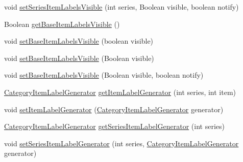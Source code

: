 \begin{DoxyCompactItemize}
\item 
void \mbox{\hyperlink{interfaceorg_1_1jfree_1_1chart_1_1renderer_1_1category_1_1_category_item_renderer_a72da4632864d702099baba455d3f8576}{set\+Series\+Item\+Labels\+Visible}} (int series, Boolean visible, boolean notify)
\item 
Boolean \mbox{\hyperlink{interfaceorg_1_1jfree_1_1chart_1_1renderer_1_1category_1_1_category_item_renderer_a2d90e661b0f4c361b2f378293310a3e6}{get\+Base\+Item\+Labels\+Visible}} ()
\item 
void \mbox{\hyperlink{interfaceorg_1_1jfree_1_1chart_1_1renderer_1_1category_1_1_category_item_renderer_ac6695ccdc953127606d151a4b17f70a7}{set\+Base\+Item\+Labels\+Visible}} (boolean visible)
\item 
void \mbox{\hyperlink{interfaceorg_1_1jfree_1_1chart_1_1renderer_1_1category_1_1_category_item_renderer_aa5ff4e5470281bba0293eaf802fb114d}{set\+Base\+Item\+Labels\+Visible}} (Boolean visible)
\item 
void \mbox{\hyperlink{interfaceorg_1_1jfree_1_1chart_1_1renderer_1_1category_1_1_category_item_renderer_ab28c1624b9b8c424bb17737b6d261d29}{set\+Base\+Item\+Labels\+Visible}} (Boolean visible, boolean notify)
\item 
\mbox{\hyperlink{interfaceorg_1_1jfree_1_1chart_1_1labels_1_1_category_item_label_generator}{Category\+Item\+Label\+Generator}} \mbox{\hyperlink{interfaceorg_1_1jfree_1_1chart_1_1renderer_1_1category_1_1_category_item_renderer_a04320f200d3febfed424b954266b114c}{get\+Item\+Label\+Generator}} (int series, int item)
\item 
void \mbox{\hyperlink{interfaceorg_1_1jfree_1_1chart_1_1renderer_1_1category_1_1_category_item_renderer_a5324b404df0d22be7a5fe117c1da97bf}{set\+Item\+Label\+Generator}} (\mbox{\hyperlink{interfaceorg_1_1jfree_1_1chart_1_1labels_1_1_category_item_label_generator}{Category\+Item\+Label\+Generator}} generator)
\item 
\mbox{\hyperlink{interfaceorg_1_1jfree_1_1chart_1_1labels_1_1_category_item_label_generator}{Category\+Item\+Label\+Generator}} \mbox{\hyperlink{interfaceorg_1_1jfree_1_1chart_1_1renderer_1_1category_1_1_category_item_renderer_a39fd0df143abb1baf56ba931552a3047}{get\+Series\+Item\+Label\+Generator}} (int series)
\item 
void \mbox{\hyperlink{interfaceorg_1_1jfree_1_1chart_1_1renderer_1_1category_1_1_category_item_renderer_a7d50a8f4cf465adb170d97a905f5160c}{set\+Series\+Item\+Label\+Generator}} (int series, \mbox{\hyperlink{interfaceorg_1_1jfree_1_1chart_1_1labels_1_1_category_item_label_generator}{Category\+Item\+Label\+Generator}} generator)

\end{DoxyCompactItemize}
